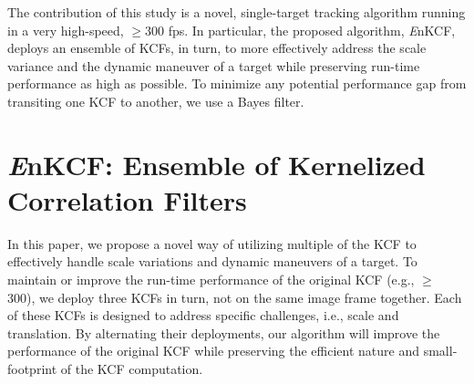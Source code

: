 \documentclass{bmvc2k}
\begin{document}
The contribution of this study is a novel, single-target tracking
algorithm running in a very high-speed, $\geq 300$ fps. In particular,
the proposed algorithm, {\it E}nKCF, deploys an ensemble of KCFs, in
turn, to more effectively address the scale variance and the dynamic
maneuver of a target while preserving run-time performance as high as
possible. To minimize any potential performance gap from transiting
one KCF to another, we use a Bayes filter.

\section{{\it E}nKCF: Ensemble of Kernelized Correlation Filters}
In this paper, we propose a novel way of utilizing multiple of the KCF
\cite{henriques2015high} to effectively handle scale variations and
dynamic maneuvers of a target. To maintain or improve the run-time
performance of the original KCF (e.g., $\ge$ 300), we deploy three
KCFs in turn, not on the same image frame together. Each of these KCFs
is designed to address specific challenges, i.e., scale and
translation. By alternating their deployments, our algorithm will
improve the performance of the original KCF while preserving the
efficient nature and small-footprint of the KCF computation. 
\end{document}
